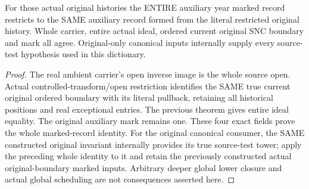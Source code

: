 \begin{theorem}
\label{hir:original-coherent-history-year-entire-auxiliary-marked-open-record}
\leanok
{}
For those actual original histories the ENTIRE auxiliary year marked record
restricts to the SAME auxiliary record formed from the literal restricted
original history. Whole carrier, entire actual ideal, ordered current original
SNC boundary and mark all agree. Original-only canonical inputs internally
supply every source-test hypothesis used in this dictionary.
\end{theorem}
\begin{proof}
The real ambient carrier's open inverse image is the whole source open. Actual
controlled-transform/open restriction identifies the SAME true current original
ordered boundary with its literal pullback, retaining all historical positions
and real exceptional entries. The previous theorem gives entire ideal equality.
The original auxiliary mark remains one. These four exact fields prove the
whole marked-record identity. For the original canonical consumer, the SAME
constructed original invariant internally provides its true source-test tower;
apply the preceding whole identity to it and retain the previously constructed
actual original-boundary marked inputs. Arbitrary deeper global lower closure
and actual global scheduling are not consequences asserted here.
\end{proof}
